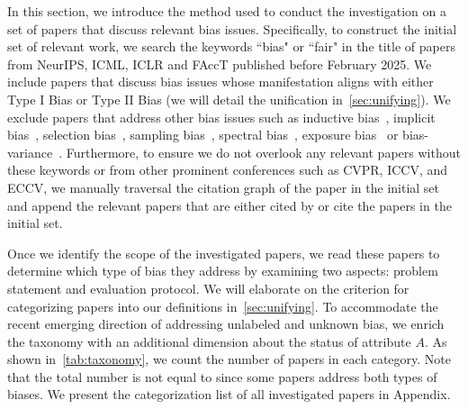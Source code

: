 \label{sec:method}

In this section, we introduce the method used to conduct the investigation on a set of \pc papers that discuss relevant bias issues.
Specifically, to construct the initial set of relevant work, we search the keywords ``bias" or ``fair" in the title of papers from NeurIPS, ICML, ICLR and FAccT published before February 2025. 
We include papers that discuss bias issues whose manifestation aligns with either Type I Bias or Type II Bias (we will detail the unification in~\cref{sec:unifying}).
We exclude papers that address other bias issues such as inductive bias~\cite{baxter2000model,zietlow2021demystifying}, implicit bias~\cite{fitzgerald2017implicit,camuto2021asymmetric}, selection bias~\cite{hernan2004structural,akbari2021recursive}, sampling bias~\cite{winship1992models,xu2022alleviating}, spectral bias~\cite{fang2024addressing}, exposure bias~\cite{li2024alleviating} or bias-variance~\cite{ha2024fine, chen2024on}.
Furthermore, to ensure we do not overlook any relevant papers without these keywords or from other prominent conferences such as CVPR, ICCV, and ECCV, we manually traversal the citation graph of the paper in the initial set and append the relevant papers that are either cited by or cite the papers in the initial set.






Once we identify the scope of the investigated papers, we read these papers to determine which type of bias they address by examining two aspects: problem statement and evaluation protocol.
We will elaborate on the criterion for categorizing papers into our definitions in~\cref{sec:unifying}.
To accommodate the recent emerging direction of addressing unlabeled and unknown bias, we enrich the taxonomy with an additional dimension about the status of attribute $A$.
As shown in~\cref{tab:taxonomy}, we count the number of papers in each category. 
Note that the total number is not equal to \pc since some papers address both types of biases.
We present the categorization list of all \pc investigated papers in Appendix.



